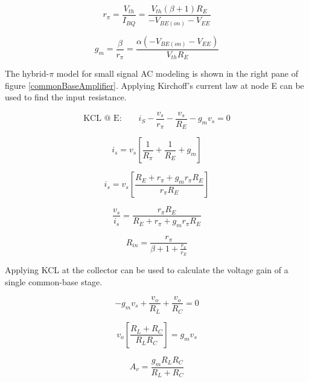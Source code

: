 \documentclass[titlepage, letterpaper, 11pt]{article}
\begin{document}
\begin{equation}
r_{\pi}=\frac{V_{th}}{I_{BQ}}
=\frac{V_{th}(\beta+1)R_{E}}{-V_{BE(on)}-V_{EE}}
\label{commonBaseRpi}
\end{equation}

\begin{equation}
g_{m}=\frac{\beta}{r_{\pi}}
=\frac{\alpha(-V_{BE(on)}-V_{EE})}{V_{th}R_{E}}
\end{equation}

The hybrid-$\pi$ model for small signal AC modeling is shown in the
right pane of figure \ref{commonBaseAmplifier}. Applying Kirchoff's
current law at node E can be used to find the input resistance.

\begin{equation*}
\textrm{KCL @ E:}\qquad
i_{S}-\frac{v_{s}}{r_{\pi}}-\frac{v_{s}}{R_{E}}-g_{m}v_{s}=0
\end{equation*}

\begin{equation*}
i_{s}=v_{s} \left[ \frac{1}{R_{\pi}}+\frac{1}{R_{E}}+g_{m} \right]
\end{equation*}

\begin{equation*}
i_{s}=v_{s} \left[
\frac{R_{E}+r_{\pi}+g_{m}r_{\pi}R_{E}}
{r_{\pi}R_{E}} \right]
\end{equation*}

\begin{equation*}
\frac{v_{s}}{i_{s}}
=\frac{r_{\pi}R_{E}}{R_{E}+r_{\pi}+g_{m}r_{\pi}R_{E}}
\end{equation*}

\begin{equation}
R_{in}=\frac{r_{\pi}}{\beta+1+\frac{r_{\pi}}{r_{E}}}
\label{commonBaseRin}
\end{equation}

Applying KCL at the collector can be used to calculate the voltage
gain of a single common-base stage.

\begin{equation*}
-g_{m}v_{s}+\frac{v_{o}}{R_{L}}+\frac{v_{o}}{R_{C}}=0
\end{equation*}

\begin{equation*}
v_{o}\left[\frac{R_{L}+R_{C}}{R_{L}R_{C}}\right]=g_{m}v_{s}
\end{equation*}

\begin{equation}
A_{v}=\frac{g_{m}R_{L}R_{C}}{R_{L}+R_{C}}
\end{equation}
\end{document}
